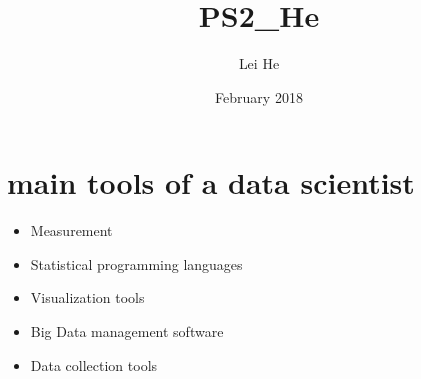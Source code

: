\documentclass{article}
\title{PS2\_He}
\author{Lei He }
\date{February 2018}
\newcommand{\bi}{\begin{itemize}}
\newcommand{\ei}{\end{itemize}}
\begin{document}
\maketitle

\section{main tools of a data scientist}

\bi

\item Measurement

\item Statistical programming languages

\item Visualization tools 

\item Big Data management software

\item Data collection tools

\ei
\end{document}
